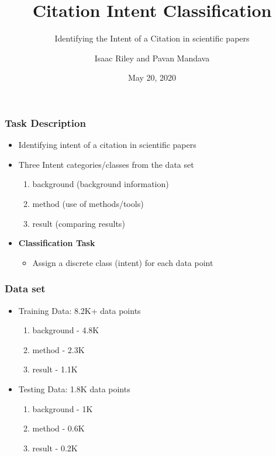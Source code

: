 \documentclass[
  xcolor={svgnames},
  hyperref={colorlinks,citecolor=DeepPink4,linkcolor=DarkRed,urlcolor=DarkBlue}
  ]{beamer}
\title[] %
{Citation Intent Classification}
\subtitle{Identifying the Intent of a Citation in scientific papers}
\author[tmip, hieutt] %
{Isaac Riley and Pavan Mandava}
\institute[Universities Here and There] %
{
  \inst{1}%
  Computational Linguistics, M.Sc.\\
  \and
  \inst{2}%
  Computational Linguistics, M.Sc.\\
}
\date[] %
{May 20, 2020}
\begin{document}
\begin{frame}
\titlepage
\end{frame}


\begin{frame}
\frametitle{Task Description}

\begin{itemize}

\item Identifying intent of a citation in scientific papers
\item Three Intent categories/classes from the data set
	\begin{enumerate}
		\item background (background information)
		\item method (use of methods/tools)
		\item result (comparing results)
	\end{enumerate}
\item {\bf Classification Task }
	\begin{itemize}
		\item Assign a discrete class (intent) for each data point
	\end{itemize}
\end{itemize}

\end{frame}

\begin{frame}
\frametitle{Data set}

\begin{itemize}

\item Training Data: 8.2K+ data points
	\begin{enumerate}
		\item background - 4.8K
		\item method - 2.3K
		\item result - 1.1K
	\end{enumerate}
\item Testing Data: 1.8K data points
	\begin{enumerate}
		\item background - 1K
		\item method - 0.6K
		\item result - 0.2K
	\end{enumerate}
\end{itemize}

\end{frame}
\end{document}
